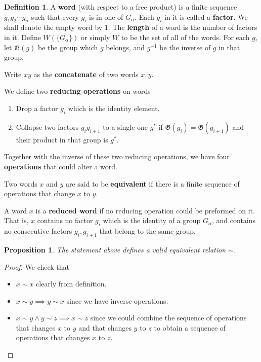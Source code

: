 \documentclass[a4paper,titlepage]{article}
\theoremstyle{remark}
\theoremstyle{definition}
\theoremstyle{definition}
\newtheorem{definition}{Definition}
\theoremstyle{plain}
\newtheorem{proposition}{Proposition}
\newcommand{\gid}{\mathfrak{G}}
\begin{document}
  \begin{definition}
    A {\bf word} (with respect to a free product) is a finite sequence $g_1 g_2 \cdots g_n$ such that
    every $g_i$ is in one of $G_\alpha$. Each $g_i$ in it is called a {\bf factor}.
    We shall denote the empty word by $1$. The {\bf length}
    of a word is the number of factors in it. Define $W(\{G_\alpha\})$ or simply $W$ 
    to be the set of all of the words. For each $g$, let $\gid(g)$ be the group which $g$ belongs, 
    and $g^{-1}$ be the inverse of $g$ in that group.

    Write $xy$ as the {\bf concatenate} of two words $x, y$.

    We define two {\bf reducing operations} on words
    \begin{enumerate}
      \item Drop a factor $g_i$ which is the identity element.
      \item Collapse two factors $g_i g_{i+1}$ to a single one $g^*$ if $\gid(g_i) = \gid(g_{i+1})$
        and their product in that group is $g^*$.
    \end{enumerate}
    Together with the inverse of these two reducing operations, we have four {\bf operations}
    that could alter a word.

    Two words $x$ and $y$ are said to be {\bf equivalent} if there is a finite sequence of 
    operations that change $x$ to $y$.

    A word $x$ is a {\bf reduced word} if no reducing operation could be preformed on it. That is,
    $x$ contains no factor $g_i$ which is the identity of a group $G_\alpha$, and contains no
    consecutive factors $g_i, g_{i+1}$ that belong to the same group.
  \end{definition}
  \begin{proposition}
    The statement above defines a valid equivalent relation $\sim$.
  \end{proposition}
  \begin{proof}
    We check that
    \begin{itemize}
      \item $x \sim x$ clearly from definition.
      \item $x \sim y \implies y \sim x$ since we have inverse operations.
      \item $x \sim y \land y \sim z \implies x \sim z$ since we could combine the sequence 
        of operations that changes $x$ to $y$ and that changes $y$ to $z$ to obtain a sequence 
        of operations that changes $x$ to $z$.
    \end{itemize}
  \end{proof}
\end{document}
